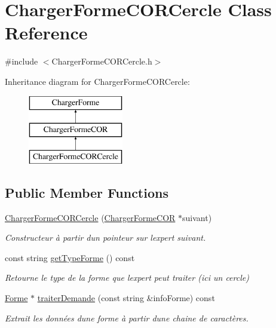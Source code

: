 \hypertarget{class_charger_forme_c_o_r_cercle}{}\section{Charger\+Forme\+C\+O\+R\+Cercle Class Reference}
\label{class_charger_forme_c_o_r_cercle}


{\ttfamily \#include $<$Charger\+Forme\+C\+O\+R\+Cercle.\+h$>$}

Inheritance diagram for Charger\+Forme\+C\+O\+R\+Cercle\+:\begin{figure}[H]
\begin{center}
\leavevmode
\includegraphics[height=3.000000cm]{class_charger_forme_c_o_r_cercle}
\end{center}
\end{figure}
\subsection*{Public Member Functions}
\begin{DoxyCompactItemize}
\item 
\hyperlink{class_charger_forme_c_o_r_cercle_aa014ab64f0a6c59c9e6d0148ec889e23}{Charger\+Forme\+C\+O\+R\+Cercle} (\hyperlink{class_charger_forme_c_o_r}{Charger\+Forme\+C\+OR} $\ast$suivant)
\begin{DoxyCompactList}\small\item\em Constructeur à partir d\textquotesingle{}un pointeur sur l\textquotesingle{}expert suivant. \end{DoxyCompactList}\item 
const string \hyperlink{class_charger_forme_c_o_r_cercle_a4ca5a036a26641c2636d376f51659172}{get\+Type\+Forme} () const
\begin{DoxyCompactList}\small\item\em Retourne le type de la forme que l\textquotesingle{}expert peut traiter (ici un cercle) \end{DoxyCompactList}\item 
\hyperlink{class_forme}{Forme} $\ast$ \hyperlink{class_charger_forme_c_o_r_cercle_ad65cbf0176ef4a65b44c5782646e45fa}{traiter\+Demande} (const string \&info\+Forme) const
\begin{DoxyCompactList}\small\item\em Extrait les données d\textquotesingle{}une forme à partir d\textquotesingle{}une chaine de caractères. \end{DoxyCompactList}\end{DoxyCompactItemize}
